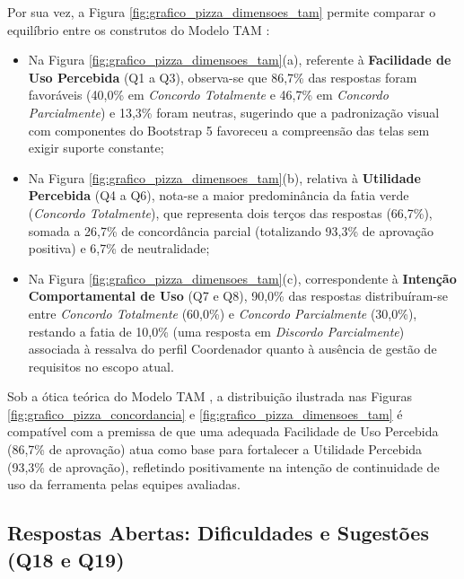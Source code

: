 Por sua vez, a Figura \ref{fig:grafico_pizza_dimensoes_tam} permite comparar o equilíbrio entre os construtos do Modelo TAM \cite{davis1989, venkatesh2000}:
\begin{itemize}
    \item Na Figura \ref{fig:grafico_pizza_dimensoes_tam}(a), referente à \textbf{Facilidade de Uso Percebida} (Q1 a Q3), observa-se que 86,7\% das respostas foram favoráveis (40,0\% em \textit{Concordo Totalmente} e 46,7\% em \textit{Concordo Parcialmente}) e 13,3\% foram neutras, sugerindo que a padronização visual com componentes do Bootstrap 5 favoreceu a compreensão das telas sem exigir suporte constante;
    \item Na Figura \ref{fig:grafico_pizza_dimensoes_tam}(b), relativa à \textbf{Utilidade Percebida} (Q4 a Q6), nota-se a maior predominância da fatia verde (\textit{Concordo Totalmente}), que representa dois terços das respostas (66,7\%), somada a 26,7\% de concordância parcial (totalizando 93,3\% de aprovação positiva) e 6,7\% de neutralidade;
    \item Na Figura \ref{fig:grafico_pizza_dimensoes_tam}(c), correspondente à \textbf{Intenção Comportamental de Uso} (Q7 e Q8), 90,0\% das respostas distribuíram-se entre \textit{Concordo Totalmente} (60,0\%) e \textit{Concordo Parcialmente} (30,0\%), restando a fatia de 10,0\% (uma resposta em \textit{Discordo Parcialmente}) associada à ressalva do perfil Coordenador quanto à ausência de gestão de requisitos no escopo atual.
\end{itemize}

Sob a ótica teórica do Modelo TAM \cite{davis1989}, a distribuição ilustrada nas Figuras \ref{fig:grafico_pizza_concordancia} e \ref{fig:grafico_pizza_dimensoes_tam} é compatível com a premissa de que uma adequada Facilidade de Uso Percebida (86,7\% de aprovação) atua como base para fortalecer a Utilidade Percebida (93,3\% de aprovação), refletindo positivamente na intenção de continuidade de uso da ferramenta pelas equipes avaliadas.

\subsection{Respostas Abertas: Dificuldades e Sugestões (Q18 e Q19)}

